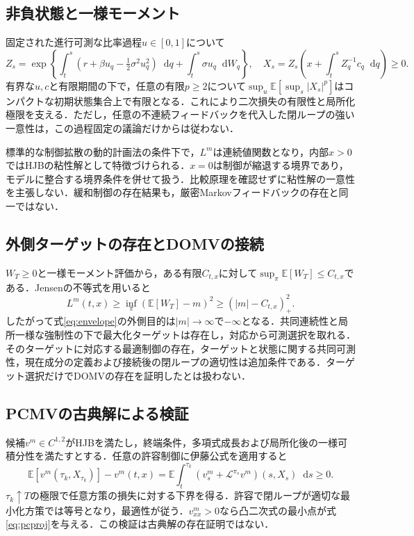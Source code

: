 \documentclass[10pt,a4paper]{article}
\numberwithin{equation}{section}
\numberwithin{table}{section}
\numberwithin{figure}{section}
\theoremstyle{plain}
\theoremstyle{definition}
\newcommand{\E}{\mathbb{E}}
\newcommand{\dd}{\mathop{}\!\mathrm{d}}
\begin{document}
\subsection{非負状態と一様モーメント}
固定された進行可測な比率過程$u\in[0,1]$について
\begin{equation}
Z_s=\exp\left\{\int_t^s(r+\beta u_q-\tfrac12\sigma^2u_q^2)\dd q+
\int_t^s\sigma u_q\dd W_q\right\},\quad
X_s=Z_s\left(x+\int_t^sZ_q^{-1}c_q\dd q\right)\geq0.
\end{equation}
有界な$u,c$と有限期間の下で，任意の有限$p\geq2$について$\sup_u\E[\sup_s|X_s|^p]$はコンパクトな初期状態集合上で有限となる．これにより二次損失の有限性と局所化極限を支える．ただし，任意の不連続フィードバックを代入した閉ループの強い一意性は，この過程固定の議論だけからは従わない．

標準的な制御拡散の動的計画法の条件下で，$L^m$は連続値関数となり，内部$x>0$ではHJBの粘性解として特徴づけられる\citep{FlemingSoner2006}．$x=0$は制御が縮退する境界であり，モデルに整合する境界条件を併せて扱う．比較原理を確認せずに粘性解の一意性を主張しない．緩和制御の存在結果も，厳密Markovフィードバックの存在と同一ではない．

\subsection{外側ターゲットの存在とDOMVの接続}
$W_T\geq0$と一様モーメント評価から，ある有限$C_{t,x}$に対して$\sup_\pi\E[W_T]\leq C_{t,x}$である．Jensenの不等式を用いると
\begin{equation}
L^m(t,x)\geq\inf_\pi(\E[W_T]-m)^2\geq(|m|-C_{t,x})_+^2.
\end{equation}
したがって式\eqref{eq:envelope}の外側目的は$|m|\to\infty$で$-\infty$となる．共同連続性と局所一様な強制性の下で最大化ターゲットは存在し，対応から可測選択を取れる．そのターゲットに対応する最適制御の存在，ターゲットと状態に関する共同可測性，現在成分の定義および接続後の閉ループの適切性は追加条件である．ターゲット選択だけでDOMVの存在を証明したとは扱わない．

\subsection{PCMVの古典解による検証}
候補$v^m\in C^{1,2}$がHJBを満たし，終端条件，多項式成長および局所化後の一様可積分性を満たすとする．任意の許容制御に伊藤公式を適用すると
\begin{equation}
\E[v^m(\tau_k,X_{\tau_k})]-v^m(t,x)
=\E\int_t^{\tau_k}(v_s^m+\mathcal L^{\pi_s}v^m)(s,X_s)\dd s\geq0.
\end{equation}
$\tau_k\uparrow T$の極限で任意方策の損失に対する下界を得る．許容で閉ループが適切な最小化方策では等号となり，最適性が従う．$v_{xx}^m>0$なら凸二次式の最小点が式\eqref{eq:pcproj}を与える．この検証は古典解の存在証明ではない．
\end{document}
